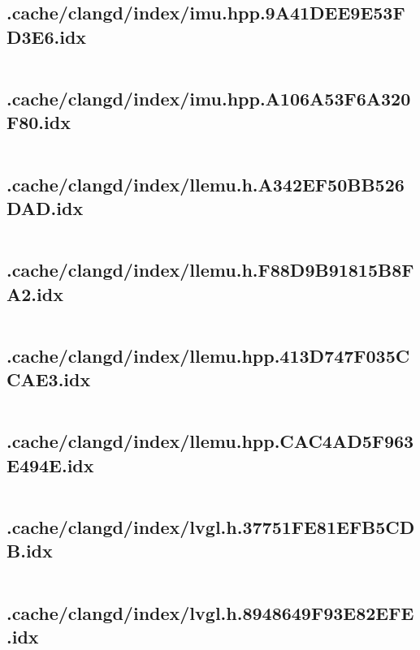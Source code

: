 \subsection{.cache/clangd/index/imu.hpp.9A41DEE9E53FD3E6.idx}
\inputminted[linenos,tabsize=2,breaklines, breakanywhere]{c}{imu.hpp.9A41DEE9E53FD3E6.idx}
\pagebreak

\subsection{.cache/clangd/index/imu.hpp.A106A53F6A320F80.idx}
\inputminted[linenos,tabsize=2,breaklines, breakanywhere]{c}{imu.hpp.A106A53F6A320F80.idx}
\pagebreak

\subsection{.cache/clangd/index/llemu.h.A342EF50BB526DAD.idx}
\inputminted[linenos,tabsize=2,breaklines, breakanywhere]{c}{llemu.h.A342EF50BB526DAD.idx}
\pagebreak

\subsection{.cache/clangd/index/llemu.h.F88D9B91815B8FA2.idx}
\inputminted[linenos,tabsize=2,breaklines, breakanywhere]{c}{llemu.h.F88D9B91815B8FA2.idx}
\pagebreak

\subsection{.cache/clangd/index/llemu.hpp.413D747F035CCAE3.idx}
\inputminted[linenos,tabsize=2,breaklines, breakanywhere]{c}{llemu.hpp.413D747F035CCAE3.idx}
\pagebreak

\subsection{.cache/clangd/index/llemu.hpp.CAC4AD5F963E494E.idx}
\inputminted[linenos,tabsize=2,breaklines, breakanywhere]{c}{llemu.hpp.CAC4AD5F963E494E.idx}
\pagebreak

\subsection{.cache/clangd/index/lvgl.h.37751FE81EFB5CDB.idx}
\inputminted[linenos,tabsize=2,breaklines, breakanywhere]{c}{lvgl.h.37751FE81EFB5CDB.idx}
\pagebreak

\subsection{.cache/clangd/index/lvgl.h.8948649F93E82EFE.idx}
\inputminted[linenos,tabsize=2,breaklines, breakanywhere]{c}{lvgl.h.8948649F93E82EFE.idx}
\pagebreak

